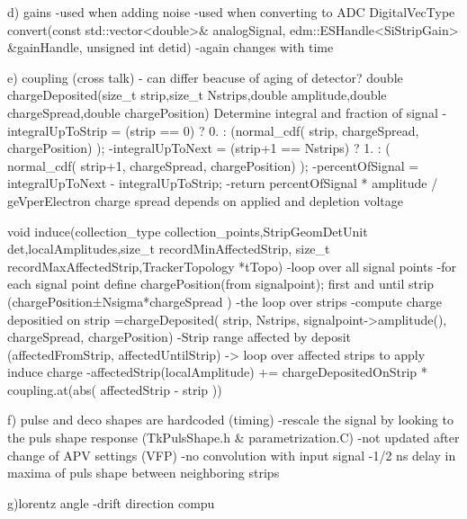 d) gains
-used when adding noise
-used when converting to ADC
DigitalVecType convert(const std::vector<double>& analogSignal, edm::ESHandle<SiStripGain> \&gainHandle, unsigned int detid)
-again changes with time

e) coupling (cross talk)
- can differ beacuse of aging of detector?
double chargeDeposited(size\_t strip,size\_t Nstrips,double amplitude,double chargeSpread,double chargePosition)
Determine integral and fraction of signal
-integralUpToStrip = (strip == 0) ? 0. : (normal\_cdf( strip, chargeSpread, chargePosition) );
-integralUpToNext = (strip+1 == Nstrips) ? 1. : ( normal\_cdf( strip+1, chargeSpread, chargePosition) );
-percentOfSignal = integralUpToNext - integralUpToStrip;
-return percentOfSignal * amplitude / geVperElectron
charge spread depends on applied and depletion voltage

void induce(collection\_type collection\_points,StripGeomDetUnit det,localAmplitudes,size\_t recordMinAffectedStrip, size\_t recordMaxAffectedStrip,TrackerTopology *tTopo)
-loop over all signal points 
-for each signal point define chargePosition(from signalpoint); first and until strip (chargePоsition±Nsigma*chargeSpread )
-the loop over strips 
-compute charge depositied on strip =chargeDeposited( strip, Nstrips, signalpoint->amplitude(), chargeSpread, chargePosition)
-Strip range affected by deposit (affectedFromStrip, affectedUntilStrip) -> loop over affected strips to apply induce charge
	-affectedStrip(localAmplitude)  += chargeDepositedOnStrip * coupling.at(abs( affectedStrip - strip ))


f) pulse and deco shapes are hardcoded (timing)
-rescale  the signal by looking to the puls shape response (TkPulsShape.h & parametrization.C)
-not updated after change of APV settings (VFP)
-no convolution with input signal
-1/2 ns delay in maxima of puls shape between neighboring strips

g)lorentz angle
-drift direction compu



